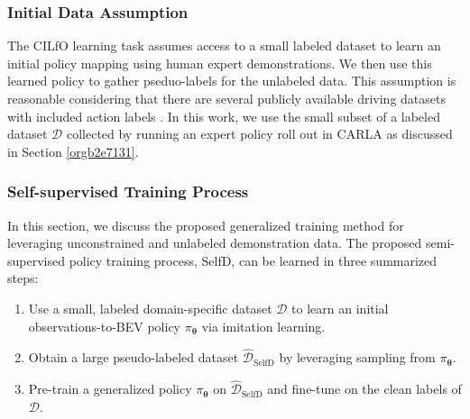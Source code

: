 \documentclass[letterpaper, 12pt]{book}
\theoremstyle{definition}
\theoremstyle{definition}
\theoremstyle{definition}
\theoremstyle{definition}
\theoremstyle{definition}
\begin{document}
\subsubsection{Initial Data Assumption}
\label{sec:org04ec2f7}
The CILfO learning task assumes access to a small labeled dataset to learn an
initial policy mapping using human expert demonstrations. We then use this
learned policy to gather pseduo-labels for the unlabeled data. This assumption
is reasonable considering that there are several publicly available driving
datasets with included action labels \cite{Geiger2012AreWR,Argoverse2}. In this
work, we use the small subset of a labeled dataset \(\mathcal{D}\) collected by running
an expert policy roll out in CARLA \cite{Dosovitskiy2017} as discussed in
Section \ref{orgb2e7131}.

\subsubsection{Self-supervised Training Process}
\label{sec:orge5d1772}
In this section, we discuss the proposed generalized training method for
leveraging unconstrained and unlabeled demonstration data. The proposed
semi-supervised policy training process, SelfD, can be learned in three
summarized steps:
\begin{enumerate}
\item Use a small, labeled domain-specific dataset \(\mathcal{D}\) to learn an initial
observations-to-BEV policy \(\pi_{\boldsymbol{\theta}}\) via imitation learning.
\item Obtain a large pseudo-labeled dataset \(\hat{\mathcal{D}}_{\text{SelfD}}\) by
leveraging sampling from \(\pi_{\boldsymbol{\theta}}\).
\item Pre-train a generalized policy \(\pi_{\boldsymbol{\theta}}\) on
\(\hat{\mathcal{D}}_{\text{SelfD}}\) and fine-tune on the clean labels of \(\mathcal{D}\).
\end{enumerate}
\end{document}
